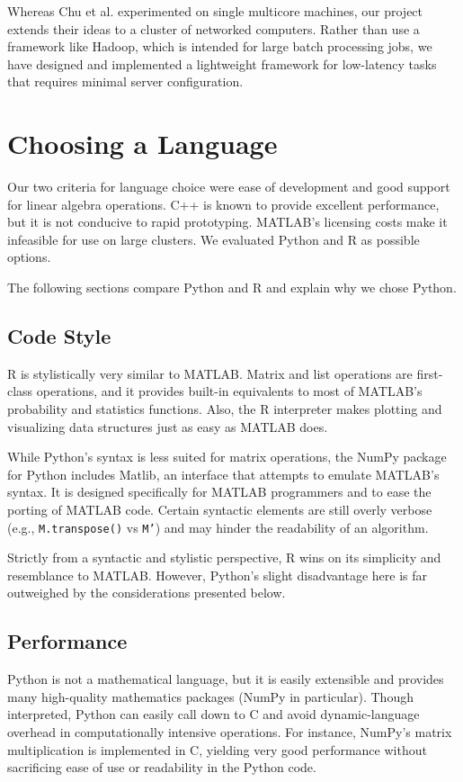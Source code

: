 \documentclass[%
  final,
  notitlepage,
  narroweqnarray,
  inline,
]{ieee}
\begin{document}
Whereas Chu et al. experimented on single multicore machines, our project
extends their ideas to a cluster of networked computers. Rather than use a
framework like Hadoop, which is intended for large batch processing jobs, we
have designed and implemented a lightweight framework for low-latency tasks
that requires minimal server configuration.

\section{Choosing a Language}

Our two criteria for language choice were ease of development and good support
for linear algebra operations. C++ is known to provide excellent performance,
but it is not conducive to rapid prototyping. MATLAB's licensing costs make it
infeasible for use on large clusters. We evaluated Python and R as possible
options.

The following sections compare Python and R and explain why we chose Python.

\subsection{Code Style}

R is stylistically very similar to MATLAB. Matrix and list operations are
first-class operations, and it provides built-in equivalents to most of
MATLAB's probability and statistics functions. Also, the R interpreter makes
plotting and visualizing data structures just as easy as MATLAB does.

While Python's syntax is less suited for matrix operations, the NumPy
package~\cite{numpy} for Python includes Matlib, an interface that attempts to
emulate MATLAB's syntax. It is designed specifically for MATLAB programmers and
to ease the porting of MATLAB code. Certain syntactic elements are still overly
verbose (e.g., \texttt{M.transpose()} vs \texttt{M'}) and may hinder the
readability of an algorithm.

Strictly from a syntactic and stylistic perspective, R wins on its simplicity
and resemblance to MATLAB. However, Python's slight disadvantage here is far
outweighed by the considerations presented below.

\subsection{Performance}

Python is not a mathematical language, but it is easily extensible and provides
many high-quality mathematics packages (NumPy in particular). Though
interpreted, Python can easily call down to C and avoid dynamic-language
overhead in computationally intensive operations. For instance, NumPy's matrix
multiplication is implemented in C, yielding very good performance
without sacrificing ease of use or readability in the Python code.
\end{document}
